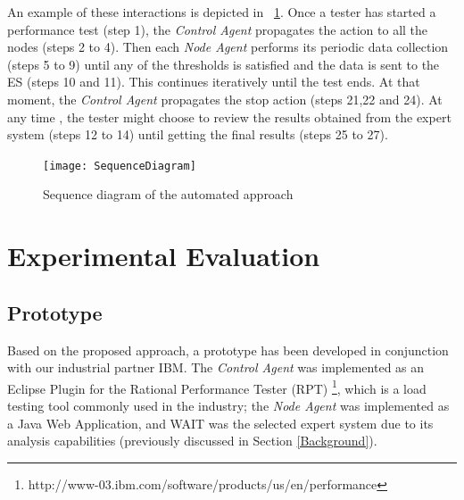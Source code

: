 \documentclass[runningheads,a4paper]{llncs}
\begin{document}
An example of these interactions is depicted in \figurename
~\ref{fig_SeqDiagram}. Once a tester has started a performance test (step 1),
the \emph{Control Agent} propagates the action to all the nodes (steps 2 to 4). Then each \emph{Node
Agent} performs its periodic data collection (steps 5 to 9) until any of the thresholds is
satisfied and the data is sent to the ES (steps 10 and 11). This continues
iteratively until the test ends. At that moment, the \emph{Control Agent} propagates the 
stop action %
(steps 21,22 and 24). At any time%
, the tester might
choose to review the %
results obtained from the expert system (steps 12 to 14) until
getting the final results (steps 25 to 27).

\begin{figure}[!h]
\centering
\texttt{[image: SequenceDiagram]}
\caption{Sequence diagram of the automated approach}
\label{fig_SeqDiagram}
\end{figure}

\vspace{-7pt}
\section{Experimental Evaluation}
\label{ExperimentalEvaluation}


\vspace{-7pt}
\subsection{Prototype}
\vspace{-7pt}
Based on the proposed approach, a prototype has been developed
in conjunction with our industrial partner IBM. The \emph{Control Agent} was
implemented as an Eclipse Plugin for the Rational Performance Tester (RPT)
\footnote{http://www-03.ibm.com/software/products/us/en/performance}, which is a
load testing tool commonly used in the industry; the \emph{Node Agent} was
implemented as a Java Web Application, and WAIT was the selected expert system
due to its analysis capabilities (previously discussed in
Section \ref{Background}).
\end{document}
